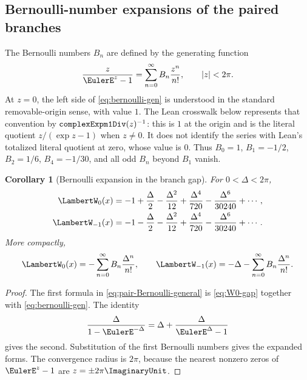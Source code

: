 \documentclass[11pt]{article}
\newtheorem{corollary}[corollary]{Corollary}
\theoremstyle{remark}
\newcommand{\Wz}{\LambertW_{0}}
\newcommand{\Wm}{\LambertW_{-1}}
\newcommand{\lean}[1]{%
  \ifmmode\text{\texttt{\detokenize{#1}}}\else\nolinkurl{#1}\fi}
\begin{document}
\subsection{Bernoulli-number expansions of the paired branches}

The Bernoulli numbers \(B_n\) are defined by the generating function
\begin{equation}\label{eq:bernoulli-gen}
       \frac{z}{\EulerE^z-1}
       =\sum_{n=0}^{\infty}B_n\frac{z^n}{n!},
       \qquad |z|<2\pi.
\end{equation}
At \(z=0\), the left side of \eqref{eq:bernoulli-gen} is understood in the
standard removable-origin sense, with value \(1\).  The Lean crosswalk below
represents that convention by
\(\lean{complexExpm1Div}(z)^{-1}\): this is \(1\) at the origin and is the
literal quotient \(z/(\exp z-1)\) when \(z\ne0\).  It does not identify the
series with Lean's totalized literal quotient at zero, whose value is \(0\).
Thus \(B_0=1\), \(B_1=-1/2\), \(B_2=1/6\),
\(B_4=-1/30\), and all odd \(B_n\) beyond \(B_1\) vanish.

\begin{corollary}[Bernoulli expansion in the branch gap]
For \(0<\Delta<2\pi\),
\begin{align}
 \Wz(x)
 &=-1+\frac\Delta2-\frac{\Delta^2}{12}
   +\frac{\Delta^4}{720}-\frac{\Delta^6}{30240}+\cdots,
 \label{eq:W0-Bernoulli}\\
 \Wm(x)
 &=-1-\frac\Delta2-\frac{\Delta^2}{12}
   +\frac{\Delta^4}{720}-\frac{\Delta^6}{30240}+\cdots.
 \label{eq:Wm-Bernoulli}
\end{align}
More compactly,
\begin{equation}\label{eq:pair-Bernoulli-general}
 \Wz(x)=-\sum_{n=0}^{\infty}B_n\frac{\Delta^n}{n!},
 \qquad
 \Wm(x)=-\Delta-
          \sum_{n=0}^{\infty}B_n\frac{\Delta^n}{n!}.
\end{equation}
\end{corollary}

\begin{proof}
The first formula in \eqref{eq:pair-Bernoulli-general} is
\eqref{eq:W0-gap} together with \eqref{eq:bernoulli-gen}.  The identity
\[
       \frac{\Delta}{1-\EulerE^{-\Delta}}
       =\Delta+\frac{\Delta}{\EulerE^\Delta-1}
\]
gives the second.  Substitution of the first Bernoulli numbers gives the
expanded forms.  The convergence radius is \(2\pi\), because the nearest
nonzero zeros of \(\EulerE^z-1\) are \(z=\pm2\pi\ImaginaryUnit\).
\end{proof}
\end{document}
